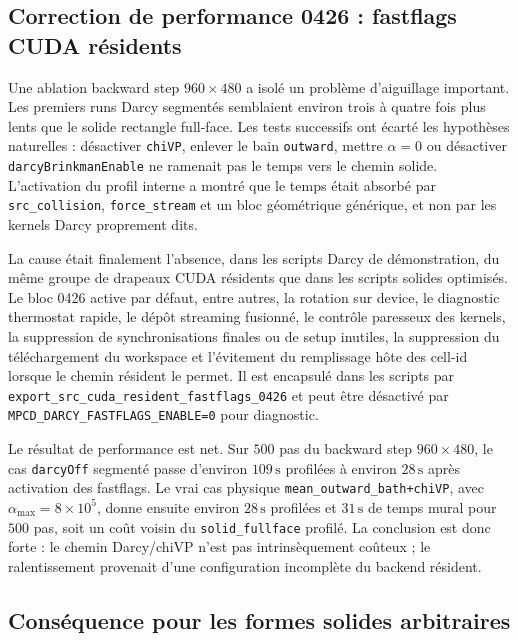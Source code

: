 \documentclass[11pt,a4paper]{article}
\begin{document}
\subsection{Correction de performance 0426 : fastflags CUDA résidents}

Une ablation backward step $960\times480$ a isolé un problème d'aiguillage important. Les premiers runs Darcy segmentés semblaient environ trois à quatre fois plus lents que le solide rectangle full-face. Les tests successifs ont écarté les hypothèses naturelles : désactiver \texttt{chiVP}, enlever le bain \texttt{outward}, mettre $\alpha=0$ ou désactiver \texttt{darcyBrinkmanEnable} ne ramenait pas le temps vers le chemin solide. L'activation du profil interne a montré que le temps était absorbé par \texttt{src\_collision}, \texttt{force\_stream} et un bloc géométrique générique, et non par les kernels Darcy proprement dits.

La cause était finalement l'absence, dans les scripts Darcy de démonstration, du même groupe de drapeaux CUDA résidents que dans les scripts solides optimisés. Le bloc 0426 active par défaut, entre autres, la rotation sur device, le diagnostic thermostat rapide, le dépôt streaming fusionné, le contrôle paresseux des kernels, la suppression de synchronisations finales ou de setup inutiles, la suppression du téléchargement du workspace et l'évitement du remplissage hôte des cell-id lorsque le chemin résident le permet. Il est encapsulé dans les scripts par \texttt{export\_src\_cuda\_resident\_fastflags\_0426} et peut être désactivé par \texttt{MPCD\_DARCY\_FASTFLAGS\_ENABLE=0} pour diagnostic.

Le résultat de performance est net. Sur $500$ pas du backward step $960\times480$, le cas \texttt{darcyOff} segmenté passe d'environ $109\,\si{\second}$ profilées à environ $28\,\si{\second}$ après activation des fastflags. Le vrai cas physique \texttt{mean\_outward\_bath+chiVP}, avec $\alpha_{\max}=8\times10^5$, donne ensuite environ $28\,\si{\second}$ profilées et $31\,\si{\second}$ de temps mural pour $500$ pas, soit un coût voisin du \texttt{solid\_fullface} profilé. La conclusion est donc forte : le chemin Darcy/chiVP n'est pas intrinsèquement coûteux ; le ralentissement provenait d'une configuration incomplète du backend résident.

\subsection{Conséquence pour les formes solides arbitraires}
\end{document}

